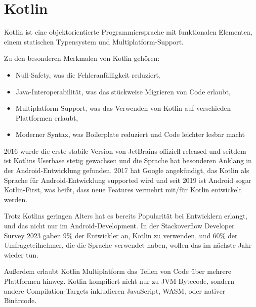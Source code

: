 
\chapter{Kotlin}\label{ch:kotlin}

Kotlin ist eine objektorientierte Programmiersprache mit funktionalen Elementen, einem statischen Typensystem und
Multiplatform-Support.

Zu den besonderen Merkmalen von Kotlin gehören:
\begin{itemize}
    \item Null-Safety, was die Fehleranfälligkeit reduziert,
    \item Java-Interoperabilität, was das stückweise Migrieren von Code erlaubt,
    \item Multiplatform-Support, was das Verwenden von Kotlin auf verschieden Plattformen erlaubt,
    \item Moderner Syntax, was Boilerplate reduziert und Code leichter lesbar macht
\end{itemize}

2016 wurde die erste stabile Version von JetBrains offiziell released und seitdem ist Kotlins Userbase
stetig gewachsen und die Sprache hat besonderen Anklang in der Android-Entwicklung gefunden.
2017 hat Google angekündigt, das Kotlin als Sprache für Android-Entwicklung supported wird und seit 2019 ist Android
sogar Kotlin-First, was heißt, dass neue Features vermehrt mit/für Kotlin entwickelt werden.

Trotz Kotlins geringen Alters hat es bereits Popularität bei Entwicklern erlangt, und das nicht nur im
Android-Development.
In der Stackoverflow Developer Survey 2023 gaben 9\% der Entwickler an, Kotlin zu verwenden, und 60\% der
Umfrageteilnehmer, die die Sprache verwendet haben, wollen das im nächste Jahr wieder tun.

Außerdem erlaubt Kotlin Multiplatform das Teilen von Code über mehrere Plattformen hinweg.
Kotlin kompiliert nicht nur zu JVM-Bytecode, sondern andere Compilation-Targets inkludieren JavaScript, WASM, oder
nativer Binärcode.\cite{androidDevKotlinFirst, kspecIntroduction, soDevSurvey23, kMediaKit}








